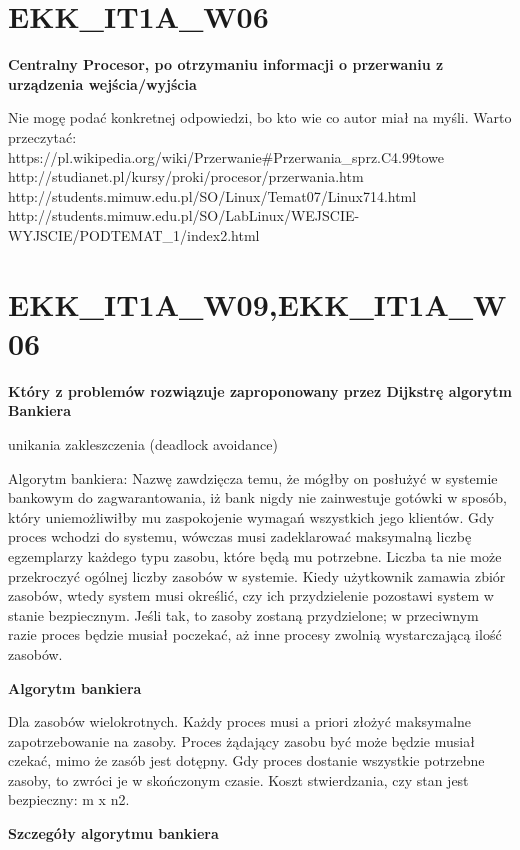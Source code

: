 \section{EKK\_IT1A\_W06}
\textbf{Centralny Procesor, po otrzymaniu informacji o przerwaniu z urządzenia wejścia/wyjścia}

\vspace{0.4cm}

Nie mogę podać konkretnej odpowiedzi, bo kto wie co autor miał na myśli. Warto przeczytać:
https://pl.wikipedia.org/wiki/Przerwanie\#Przerwania\_sprz.C4.99towe
http://studianet.pl/kursy/proki/procesor/przerwania.htm
http://students.mimuw.edu.pl/SO/Linux/Temat07/Linux714.html
http://students.mimuw.edu.pl/SO/LabLinux/WEJSCIE-WYJSCIE/PODTEMAT\_1/index2.html



\section{EKK\_IT1A\_W09,EKK\_IT1A\_W06}
\textbf{Który z problemów rozwiązuje zaproponowany przez Dijkstrę algorytm Bankiera}

\vspace{0.4cm}

unikania zakleszczenia (deadlock avoidance)

Algorytm bankiera:
Nazwę zawdzięcza temu, że mógłby on posłużyć w systemie bankowym do zagwarantowania, iż bank nigdy nie zainwestuje gotówki w sposób, który uniemożliwiłby mu zaspokojenie wymagań wszystkich jego klientów.
Gdy proces wchodzi do systemu, wówczas musi zadeklarować maksymalną liczbę egzemplarzy każdego typu zasobu, które będą mu potrzebne.
Liczba ta nie może przekroczyć ogólnej liczby zasobów w systemie. 
Kiedy użytkownik zamawia zbiór zasobów, wtedy system musi określić, czy ich przydzielenie pozostawi system w stanie bezpiecznym. Jeśli tak, to zasoby zostaną przydzielone; w przeciwnym razie proces będzie musiał poczekać, aż inne procesy zwolnią wystarczającą ilość zasobów.

\textbf{Algorytm bankiera}

    Dla zasobów wielokrotnych. Każdy proces musi a priori złożyć maksymalne zapotrzebowanie na zasoby. Proces żądający zasobu być może będzie musiał czekać, mimo że zasób jest dotępny.     Gdy proces dostanie wszystkie potrzebne zasoby, to zwróci je w skończonym czasie. Koszt stwierdzania, czy stan jest bezpieczny: m x n2.

\textbf{Szczegóły algorytmu bankiera}

